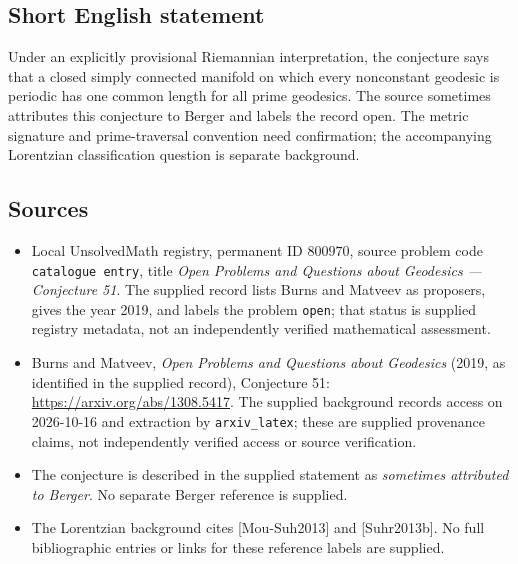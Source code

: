 \documentclass[11pt]{article}
\begin{document}
\subsection{Short English statement}
Under an explicitly provisional Riemannian interpretation, the conjecture says that a closed simply connected manifold on which every nonconstant geodesic is periodic has one common length for all prime geodesics. The source sometimes attributes this conjecture to Berger and labels the record open. The metric signature and prime-traversal convention need confirmation; the accompanying Lorentzian classification question is separate background.
\subsection{Sources}
\begin{itemize}
\item Local UnsolvedMath registry, permanent ID \(800970\), source problem code \texttt{catalogue entry}, title \emph{Open Problems and Questions about Geodesics --- Conjecture 51}. The supplied record lists Burns and Matveev as proposers, gives the year 2019, and labels the problem \texttt{open}; that status is supplied registry metadata, not an independently verified mathematical assessment.
\item Burns and Matveev, \emph{Open Problems and Questions about Geodesics} (2019, as identified in the supplied record), Conjecture 51: \url{https://arxiv.org/abs/1308.5417}. The supplied background records access on 2026-10-16 and extraction by \texttt{arxiv\_latex}; these are supplied provenance claims, not independently verified access or source verification.
\item The conjecture is described in the supplied statement as \emph{sometimes attributed to Berger}. No separate Berger reference is supplied.
\item The Lorentzian background cites \textnormal{[Mou-Suh2013]} and \textnormal{[Suhr2013b]}. No full bibliographic entries or links for these reference labels are supplied.
\end{itemize}
\end{document}
